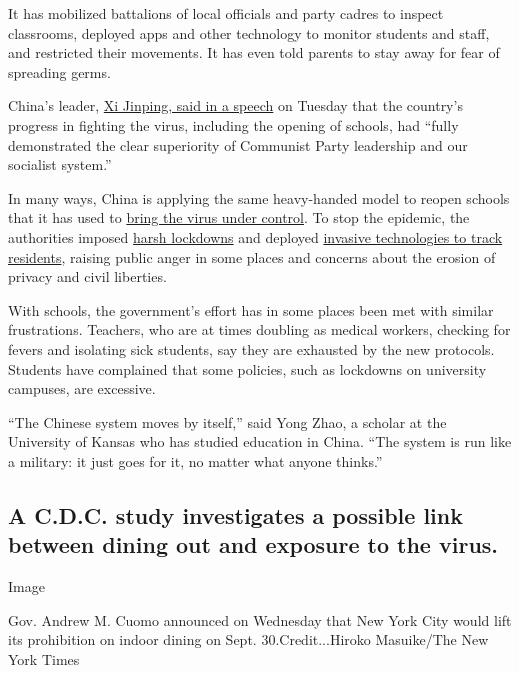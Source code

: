 It has mobilized battalions of local officials and party cadres to
inspect classrooms, deployed apps and other technology to monitor
students and staff, and restricted their movements. It has even told
parents to stay away for fear of spreading germs.

China's leader,
\href{https://www.nytimes3xbfgragh.onion/2020/09/07/world/covid-19-coronavirus.html\#link-adc17f7}{Xi
Jinping, said in a speech} on Tuesday that the country's progress in
fighting the virus, including the opening of schools, had ``fully
demonstrated the clear superiority of Communist Party leadership and our
socialist system.''

In many ways, China is applying the same heavy-handed model to reopen
schools that it has used to
\href{https://www.nytimes3xbfgragh.onion/2020/03/07/world/asia/china-coronavirus-cost.html}{bring
the virus under control}. To stop the epidemic, the authorities imposed
\href{https://www.nytimes3xbfgragh.onion/2020/02/06/world/asia/coronavirus-china-wuhan-quarantine.html}{harsh
lockdowns} and deployed
\href{https://www.nytimes3xbfgragh.onion/2020/05/26/technology/china-coronavirus-surveillance.html}{invasive
technologies to track residents}, raising public anger in some places
and concerns about the erosion of privacy and civil liberties.

With schools, the government's effort has in some places been met with
similar frustrations. Teachers, who are at times doubling as medical
workers, checking for fevers and isolating sick students, say they are
exhausted by the new protocols. Students have complained that some
policies, such as lockdowns on university campuses, are excessive.

``The Chinese system moves by itself,'' said Yong Zhao, a scholar at the
University of Kansas who has studied education in China. ``The system is
run like a military: it just goes for it, no matter what anyone
thinks.''

\hypertarget{a-cdc-study-investigates-a-possible-link-between-dining-out-and-exposure-to-the-virus}{%
\subsection{A C.D.C. study investigates a possible link between dining
out and exposure to the
virus.}\label{a-cdc-study-investigates-a-possible-link-between-dining-out-and-exposure-to-the-virus}}

Image

Gov. Andrew M. Cuomo announced on Wednesday that New York City would
lift its prohibition on indoor dining on Sept. 30.Credit...Hiroko
Masuike/The New York Times

